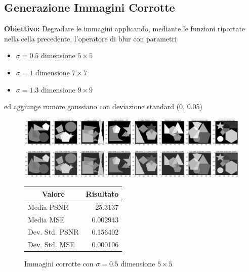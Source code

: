 \subsection{Generazione Immagini Corrotte}
\textbf{Obiettivo:}
Degradare le immagini applicando, mediante le funzioni riportate nella cella precedente,  l'operatore di blur con parametri
\begin{itemize}
    \item{$\sigma=0.5$ dimensione $5\times 5$}
    \item{$\sigma=1$ dimensione $7\times 7$}
    \item{$\sigma=1.3$ dimensione $9\times 9$}
\end{itemize}
ed aggiunge rumore gaussiano con deviazione standard (0, 0.05)

\begin{figure}[H]
    \centering
    \begin{minipage}[h]{0.5\textwidth}
        \centering
    \includegraphics[width=\linewidth]{imgRel/datasetcorrotto/datasetcorrotto5x5.png}\label{fig:imgcorrotte1}
    \end{minipage}%
    \begin{minipage}[h]{0.5\textwidth}
        \centering
        \begin{tabular}{|lr|}
        \hline
        \multicolumn{1}{|c}{\textbf{Valore}} & \multicolumn{1}{c|}{\textbf{Risultato}} \\ \hline
        Media PSNR                           & 25.3137                                 \\
        Media MSE                            & 0.002943                                \\
        Dev. Std. PSNR                       & 0.156402                                \\
        Dev. Std. MSE                        & 0.000106                                \\ \hline
        \end{tabular}\label{tab:tabcorrotte1}
    \end{minipage}
    \captionsetup{labelformat=andtable}
    \caption{Immagini corrotte con $\sigma = 0.5$ dimensione $5 \times 5$}
\end{figure}

